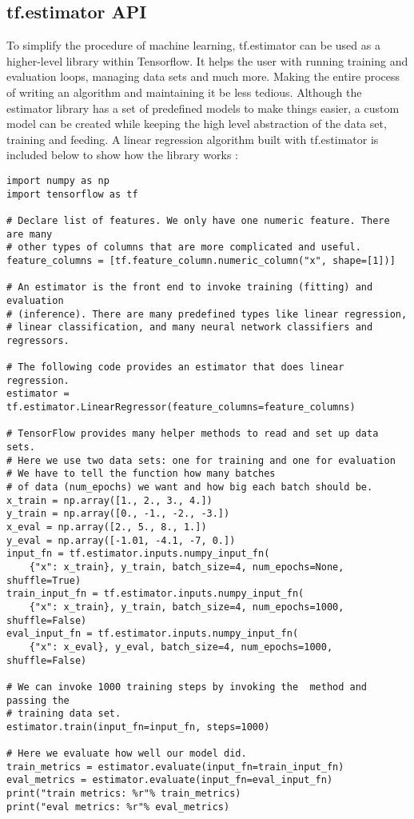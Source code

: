 \subsection{tf.estimator API}
To simplify the procedure of machine learning,
tf.estimator can be used as a higher-level library within Tensorflow.
It helps the user with running training and evaluation loops, managing data sets and much more. 
Making the entire process of writing an algorithm and maintaining it be less tedious.
Although the estimator library has a set of predefined models to make things easier, a custom model can be created while keeping the high
level abstraction of the data set, training and feeding.
A linear regression algorithm built with tf.estimator is included below
to show how the library works \cite{Estimator}:

\begin{adjustbox}{width=\textwidth}
\begin{lstlisting}
import numpy as np
import tensorflow as tf

# Declare list of features. We only have one numeric feature. There are many
# other types of columns that are more complicated and useful.
feature_columns = [tf.feature_column.numeric_column("x", shape=[1])]

# An estimator is the front end to invoke training (fitting) and evaluation
# (inference). There are many predefined types like linear regression,
# linear classification, and many neural network classifiers and regressors.

# The following code provides an estimator that does linear regression.
estimator = tf.estimator.LinearRegressor(feature_columns=feature_columns)

# TensorFlow provides many helper methods to read and set up data sets.
# Here we use two data sets: one for training and one for evaluation
# We have to tell the function how many batches
# of data (num_epochs) we want and how big each batch should be.
x_train = np.array([1., 2., 3., 4.])
y_train = np.array([0., -1., -2., -3.])
x_eval = np.array([2., 5., 8., 1.])
y_eval = np.array([-1.01, -4.1, -7, 0.])
input_fn = tf.estimator.inputs.numpy_input_fn(
    {"x": x_train}, y_train, batch_size=4, num_epochs=None, shuffle=True)
train_input_fn = tf.estimator.inputs.numpy_input_fn(
    {"x": x_train}, y_train, batch_size=4, num_epochs=1000, shuffle=False)
eval_input_fn = tf.estimator.inputs.numpy_input_fn(
    {"x": x_eval}, y_eval, batch_size=4, num_epochs=1000, shuffle=False)

# We can invoke 1000 training steps by invoking the  method and passing the
# training data set.
estimator.train(input_fn=input_fn, steps=1000)

# Here we evaluate how well our model did.
train_metrics = estimator.evaluate(input_fn=train_input_fn)
eval_metrics = estimator.evaluate(input_fn=eval_input_fn)
print("train metrics: %r"% train_metrics)
print("eval metrics: %r"% eval_metrics)
\end{lstlisting}
\end{adjustbox}


